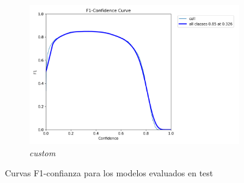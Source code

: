 \documentclass[12pt,a4paper,onecolumn,oneside]{report}
\begin{document}
\begin{figure}[H]
  \vspace{0.5cm}
  \begin{subfigure}[b]{0.48\textwidth}
    \centering
    \includegraphics[width=\textwidth]{figuras/resultados experimentacion/custom/test/BoxF1_curve.png}
    \caption{\textit{custom}}
    \label{fig:custom_test}
  \end{subfigure}
  
  \caption{Curvas F1-confianza para los modelos evaluados en test}
  \label{fig:f1_curves_test}
\end{figure}
\end{document}
